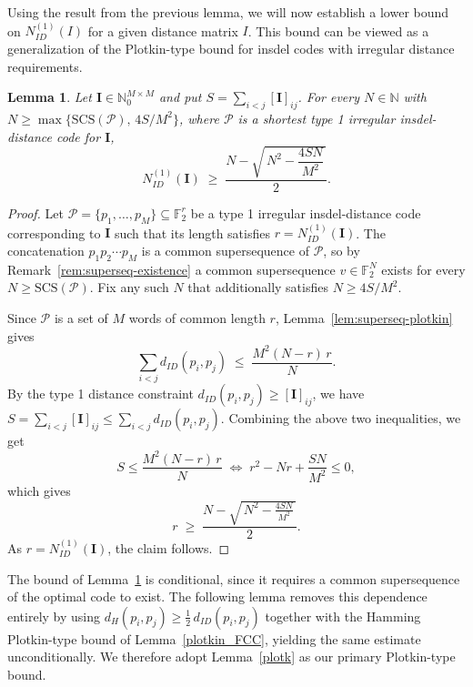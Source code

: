 \documentclass[11 pt]{article}
\numberwithin{equation}{section}
\newtheorem{lemma}[theorem]{Lemma}
\begin{document}
    Using the result from the previous lemma, we will now establish a lower bound on $N_{ID}^{(1)}(I)$ for a given distance matrix $I$. This bound can be viewed as a generalization of the Plotkin-type bound for insdel codes with irregular distance requirements.

    \begin{lemma}\label{plotkin-like-bound}
    Let $\mathbf{I}\in\mathbb{N}_0^{M\times M}$ and put $S=\sum_{i<j}[\mathbf{I}]_{ij}$. For every $N\in\mathbb{N}$ with $N\ge \max\{\mathrm{SCS}(\mathcal{P}),\,4S/M^{2}\}$, where $\mathcal{P}$ is a shortest type 1 irregular insdel-distance code for $\mathbf{I}$,
    \[
        N_{ID}^{(1)}(\mathbf{I})\;\ge\;\frac{N-\sqrt{\,N^{2}-\dfrac{4SN}{M^{2}}\,}}{2}.
    \]
    \end{lemma}

    \begin{proof}
    Let $\mathcal{P}=\{p_1,\dots,p_M\}\subseteq\mathbb{F}_2^{r}$ be a type 1 irregular insdel-distance code corresponding to $\mathbf{I}$ such that its length satisfies $r=N_{ID}^{(1)}(\mathbf{I})$. The concatenation $p_1p_2\cdots p_M$ is a common supersequence of $\mathcal{P}$, so by Remark~\ref{rem:superseq-existence} a common supersequence $v\in\mathbb{F}_2^{N}$ exists for every $N\ge \mathrm{SCS}(\mathcal{P})$.
    Fix any such $N$ that additionally satisfies $N\ge 4S/M^{2}$.

    Since $\mathcal{P}$ is a set of $M$ words of common length $r$, Lemma~\ref{lem:superseq-plotkin} gives
    \[
  \sum_{i<j} d_{ID}(p_i,p_j)\;\le\;\frac{M^{2}(N-r)\,r}{N}.
    \]
    By the type 1 distance constraint $d_{ID}(p_i,p_j)\ge[\mathbf{I}]_{ij}$, we have $S=\sum_{i<j}[\mathbf{I}]_{ij}\le \sum_{i<j} d_{ID}(p_i,p_j)$. Combining the above two inequalities, we get
    \[
    S\le \frac{M^{2}(N-r)\,r}{N}
    \;\Longleftrightarrow\;
    r^{2}-Nr+\frac{SN}{M^{2}}\le 0,
    \]
    which gives
    \[
    r\;\ge\;\frac{N-\sqrt{\,N^{2}-\frac{4SN}{M^{2}}\,}}{2}.
    \]
    As $r=N_{ID}^{(1)}(\mathbf{I})$, the claim follows.
    \end{proof}
    
    

    
    The bound of Lemma~\ref{plotkin-like-bound} is conditional, since it requires a common supersequence of the optimal code to exist. The following lemma removes this dependence entirely by using $d_{H}(p_i,p_j)\ge\tfrac12\,d_{ID}(p_i,p_j)$ together with the Hamming Plotkin-type bound of Lemma~\ref{plotkin_FCC}, yielding the same estimate unconditionally. We therefore adopt Lemma~\ref{plotk} as our primary Plotkin-type bound.
\end{document}
